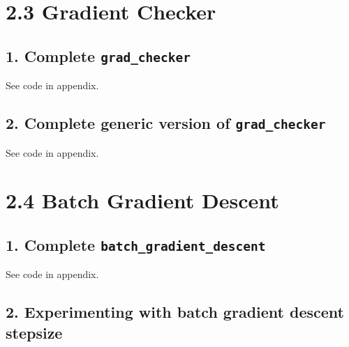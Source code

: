 \documentclass[paper=a4, fontsize=11pt]{scrartcl} %
\numberwithin{equation}{section} %
\numberwithin{figure}{section} %
\numberwithin{table}{section} %
\begin{document}

\section*{2.3 Gradient Checker}

\subsection*{1. Complete \texttt{grad\_checker}}

See code in appendix.

\subsection*{2. Complete generic version of \texttt{grad\_checker}}

See code in appendix.



\section*{2.4 Batch Gradient Descent}

\subsection*{1. Complete \texttt{batch\_gradient\_descent}}

See code in appendix.

\subsection*{2. Experimenting with batch gradient descent stepsize}
\end{document}
